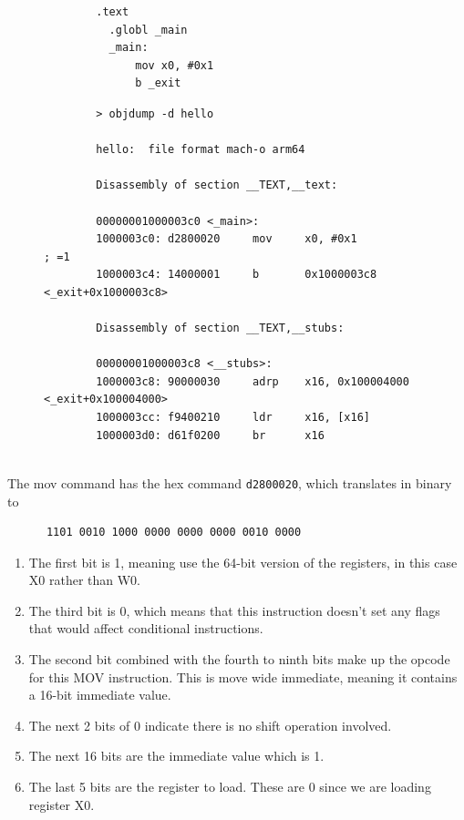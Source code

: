   \begin{example}
    \label{ex:objdump-d}
    \begin{figure}[H]
      \centering 
      \begin{lstlisting}
        .text
          .globl _main
          _main:
              mov x0, #0x1
              b _exit
      \end{lstlisting}
      \caption{} 
    \end{figure} 

    \begin{figure}[H]
      \centering 
      \begin{lstlisting}
        > objdump -d hello 

        hello:  file format mach-o arm64

        Disassembly of section __TEXT,__text:

        00000001000003c0 <_main>:
        1000003c0: d2800020     mov     x0, #0x1                ; =1
        1000003c4: 14000001     b       0x1000003c8 <_exit+0x1000003c8>

        Disassembly of section __TEXT,__stubs:

        00000001000003c8 <__stubs>:
        1000003c8: 90000030     adrp    x16, 0x100004000 <_exit+0x100004000>
        1000003cc: f9400210     ldr     x16, [x16]
        1000003d0: d61f0200     br      x16
        
      \end{lstlisting}
      \caption{} 
    \end{figure}

    The mov command has the hex command \texttt{d2800020}, which translates in binary to 
    \begin{lstlisting}
      1101 0010 1000 0000 0000 0000 0010 0000
    \end{lstlisting}

    \begin{enumerate}
      \item The first bit is 1, meaning use the 64-bit version of the registers, in this case X0 rather than W0.

      \item The third bit is 0, which means that this instruction doesn’t set any flags that would affect conditional instructions.

      \item The second bit combined with the fourth to ninth bits make up the opcode for this MOV instruction. This is move wide immediate, meaning it contains a 16-bit immediate value.

      \item The next 2 bits of 0 indicate there is no shift operation involved.

      \item The next 16 bits are the immediate value which is 1.

      \item The last 5 bits are the register to load. These are 0 since we are loading register X0.
    \end{enumerate}
  \end{example}

